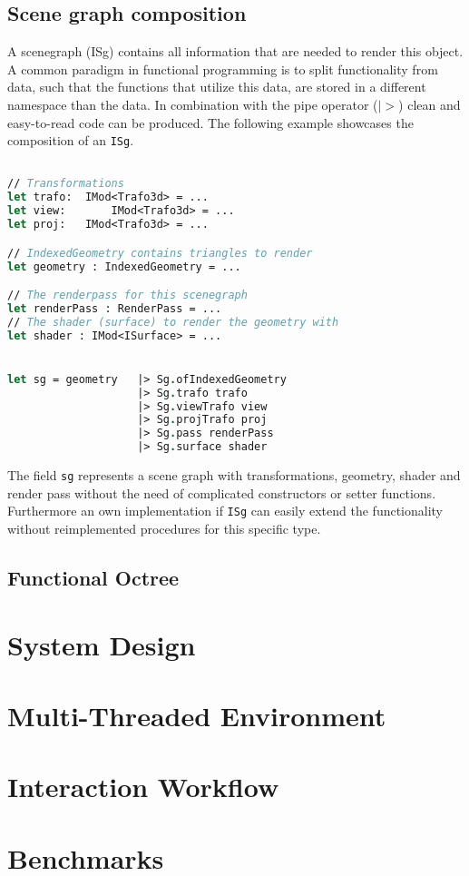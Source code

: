 \subsection{Scene graph composition}
\label{sec:isg}
A scenegraph (ISg) contains all information that are needed to render this object. A common paradigm in functional programming is to split functionality from data, such that the functions that utilize this data, are stored in a different namespace than the data. In combination with the pipe operator ($|>$) clean and easy-to-read code can be produced. The following example showcases the composition of an \verb|ISg|. 

\begin{lstlisting}[language = FSharp]

// Transformations
let trafo:	IMod<Trafo3d> = ... 
let view:		IMod<Trafo3d> = ...
let proj:  	IMod<Trafo3d> = ...

// IndexedGeometry contains triangles to render
let geometry : IndexedGeometry = ...

// The renderpass for this scenegraph
let renderPass : RenderPass = ...
// The shader (surface) to render the geometry with
let shader : IMod<ISurface> = ...


let sg = geometry	|> Sg.ofIndexedGeometry
					|> Sg.trafo trafo
					|> Sg.viewTrafo view
					|> Sg.projTrafo proj
					|> Sg.pass renderPass
					|> Sg.surface shader
\end{lstlisting}

The field \verb|sg| represents a scene graph with transformations, geometry, shader and render pass without the need of complicated constructors or setter functions. Furthermore an own implementation if \verb|ISg| can easily extend the functionality without reimplemented procedures for this specific type. 


\subsection{Functional Octree}
\section{System Design}
\section{Multi-Threaded Environment}
\section{Interaction Workflow}
\section{Benchmarks}